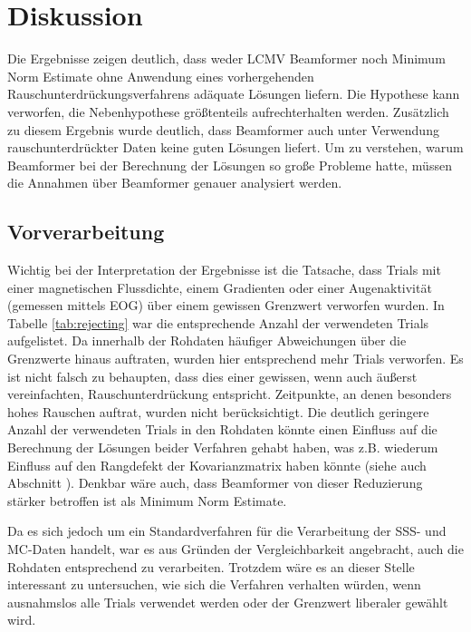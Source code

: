 \documentclass[doc,a4paper,12pt]{apa6}
\makeatletter
\DeclareRobustCommand*{\nameref}[1]{%
      \glqq{\myorg@nameref{#1}}\grqq%
    }%
\makeatother
\begin{document}
\newpage

\section{Diskussion}
\label{sec:diskussion}

Die Ergebnisse zeigen deutlich, dass weder LCMV Beamformer noch Minimum Norm Estimate ohne Anwendung eines vorhergehenden Rauschunterdrückungsverfahrens adäquate Lösungen liefern. Die Hypothese kann verworfen, die Nebenhypothese größtenteils aufrechterhalten werden. Zusätzlich zu diesem Ergebnis wurde deutlich, dass Beamformer auch unter Verwendung rauschunterdrückter Daten keine guten Lösungen liefert. Um zu verstehen, warum Beamformer bei der Berechnung der Lösungen so große Probleme hatte, müssen die Annahmen über Beamformer genauer analysiert werden.

\subsection{Vorverarbeitung}

Wichtig bei der Interpretation der Ergebnisse ist die Tatsache, dass Trials mit einer magnetischen Flussdichte, einem Gradienten oder einer Augenaktivität (gemessen mittels EOG) über einem gewissen Grenzwert verworfen wurden. In Tabelle \ref{tab:rejecting} war die entsprechende Anzahl der verwendeten Trials aufgelistet. Da innerhalb der Rohdaten häufiger Abweichungen über die Grenzwerte hinaus auftraten, wurden hier entsprechend mehr Trials verworfen. Es ist nicht falsch zu behaupten, dass dies einer gewissen, wenn auch äußerst vereinfachten, Rauschunterdrückung entspricht. Zeitpunkte, an denen besonders hohes Rauschen auftrat, wurden nicht berücksichtigt. Die deutlich geringere Anzahl der verwendeten Trials in den Rohdaten könnte einen Einfluss auf die Berechnung der Lösungen beider Verfahren gehabt haben, was z.B. wiederum Einfluss auf den Rangdefekt der Kovarianzmatrix haben könnte (siehe auch Abschnitt \nameref{sec:regu-kov}). Denkbar wäre auch, dass Beamformer von dieser Reduzierung stärker betroffen ist als Minimum Norm Estimate.

Da es sich jedoch um ein Standardverfahren für die Verarbeitung der SSS- und MC-Daten handelt, war es aus Gründen der Vergleichbarkeit angebracht, auch die Rohdaten entsprechend zu verarbeiten. Trotzdem wäre es an dieser Stelle interessant zu untersuchen, wie sich die Verfahren verhalten würden, wenn ausnahmslos alle Trials verwendet werden oder der Grenzwert liberaler gewählt wird.
\end{document}
